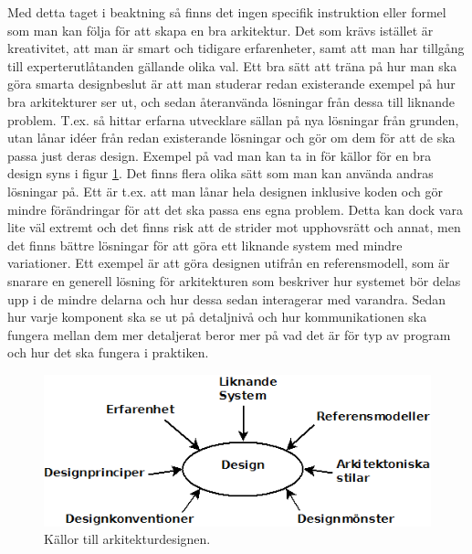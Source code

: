 \newline
\newline
Med detta taget i beaktning så finns det ingen specifik instruktion eller formel som man kan följa för att skapa en bra arkitektur. Det som krävs istället är kreativitet, att man är smart och tidigare erfarenheter, samt att man har tillgång till experterutlåtanden gällande olika val.
\newline
\newline
Ett bra sätt att träna på hur man ska göra smarta designbeslut är att man studerar redan existerande exempel på hur bra arkitekturer ser ut, och sedan återanvända lösningar från dessa till liknande problem. T.ex. så hittar erfarna utvecklare sällan på nya lösningar från grunden, utan lånar idéer från redan existerande lösningar och gör om dem för att de ska passa just deras design. Exempel på vad man kan ta in för källor för en bra design syns i figur \ref{fig:des}.
\newline
\newline
Det finns flera olika sätt som man kan använda andras lösningar på. Ett är t.ex. att man lånar hela designen inklusive koden och gör mindre förändringar för att det ska passa ens egna problem. Detta kan dock vara lite väl extremt och det finns risk att de strider mot upphovsrätt och annat, men det finns bättre lösningar för att göra ett liknande system med mindre variationer. Ett exempel är att göra designen utifrån en referensmodell, som är snarare en generell lösning för arkitekturen som beskriver hur systemet bör delas upp i de mindre delarna och hur dessa sedan interagerar med varandra. Sedan hur varje komponent ska se ut på detaljnivå och hur kommunikationen ska fungera mellan dem mer detaljerat beror mer på vad det är för typ av program och hur det ska fungera i praktiken. \cite[s. 226--227]{set}

\begin{figure}[h]
\centerline{\includegraphics[scale=0.6]{sebastian-tex/grafik/designadviceny.png}}
\caption{Källor till arkitekturdesignen.}
\label{fig:des}
\end{figure}

